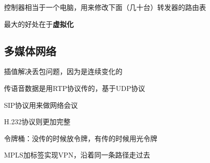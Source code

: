 \begin{center}
\end{center}

控制器相当于一个电脑，用来修改下面（几十台）转发器的路由表

最大的好处在于\textbf{虚拟化}

\subsection{多媒体网络}
插值解决丢包问题，因为是连续变化的

传语音数据是用RTP协议传的，基于UDP协议

SIP协议用来做网络会议

H.232协议则更加完整

令牌桶：没传的时候放令牌，有传的时候用光令牌

MPLS加标签实现VPN，沿着同一条路径走过去